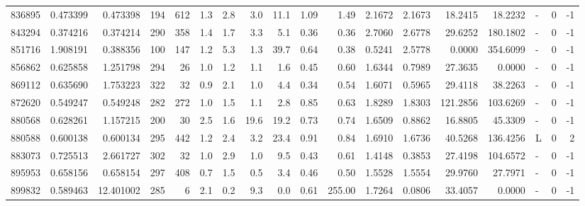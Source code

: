 \begin{tabular}{rrrrrrrrrrrrrrrlrr}
    836895 & 0.473399 &   0.473398 &  194 &  612 &      1.3 &      2.8 &     3.0 &     11.1 &       1.09 &        1.49 &  2.1672 &  2.1673 &   18.2415 &   18.2232 &             - &        0 &         -1 \\
    843294 & 0.374216 &   0.374214 &  290 &  358 &      1.4 &      1.7 &     3.3 &      5.1 &       0.36 &        0.36 &  2.7060 &  2.6778 &   29.6252 &  180.1802 &             - &        0 &         -1 \\
    851716 & 1.908191 &   0.388356 &  100 &  147 &      1.2 &      5.3 &     1.3 &     39.7 &       0.64 &        0.38 &  0.5241 &  2.5778 &    0.0000 &  354.6099 &             - &        0 &         -1 \\
    856862 & 0.625858 &   1.251798 &  294 &   26 &      1.0 &      1.2 &     1.1 &      1.6 &       0.45 &        0.60 &  1.6344 &  0.7989 &   27.3635 &    0.0000 &             - &        0 &         -1 \\
    869112 & 0.635690 &   1.753223 &  322 &   32 &      0.9 &      2.1 &     1.0 &      4.4 &       0.34 &        0.54 &  1.6071 &  0.5965 &   29.4118 &   38.2263 &             - &        0 &         -1 \\
    872620 & 0.549247 &   0.549248 &  282 &  272 &      1.0 &      1.5 &     1.1 &      2.8 &       0.85 &        0.63 &  1.8289 &  1.8303 &  121.2856 &  103.6269 &             - &        0 &         -1 \\
    880568 & 0.628261 &   1.157215 &  200 &   30 &      2.5 &      1.6 &    19.6 &     19.2 &       0.73 &        0.74 &  1.6509 &  0.8862 &   16.8805 &   45.3309 &             - &        0 &         -1 \\
    880588 & 0.600138 &   0.600134 &  295 &  442 &      1.2 &      2.4 &     3.2 &     23.4 &       0.91 &        0.84 &  1.6910 &  1.6736 &   40.5268 &  136.4256 &             L &        0 &          2 \\
    883073 & 0.725513 &   2.661727 &  302 &   32 &      1.0 &      2.9 &     1.0 &      9.5 &       0.43 &        0.61 &  1.4148 &  0.3853 &   27.4198 &  104.6572 &             - &        0 &         -1 \\
    895953 & 0.658156 &   0.658154 &  297 &  408 &      0.7 &      1.5 &     0.5 &      3.4 &       0.46 &        0.50 &  1.5528 &  1.5554 &   29.9760 &   27.7971 &             - &        0 &         -1 \\
    899832 & 0.589463 &  12.401002 &  285 &    6 &      2.1 &      0.2 &     9.3 &      0.0 &       0.61 &      255.00 &  1.7264 &  0.0806 &   33.4057 &    0.0000 &             - &        0 &         -1 \\

\end{tabular}
